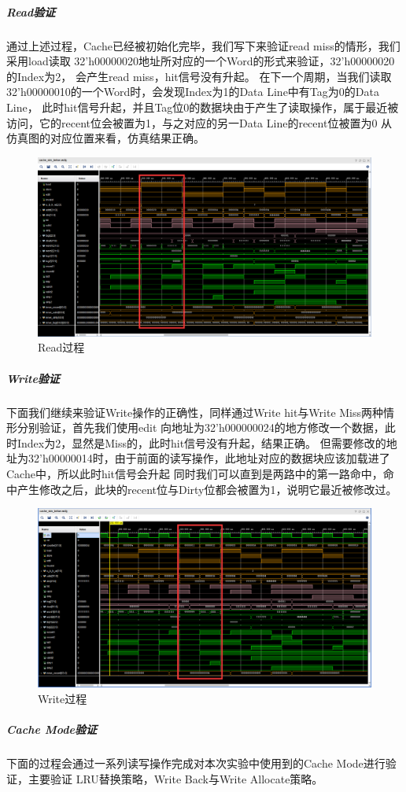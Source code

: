 \subparagraph{Read验证}
通过上述过程，Cache已经被初始化完毕，我们写下来验证read miss的情形，我们采用load读取
32'h00000020地址所对应的一个Word的形式来验证，32'h00000020的Index为2，
会产生read miss，hit信号没有升起。
在下一个周期，当我们读取32'h00000010的一个Word时，会发现Index为1的Data Line中有Tag为0的Data Line，
此时hit信号升起，并且Tag位0的数据块由于产生了读取操作，属于最近被访问，它的recent位会被置为1，与之对应的另一Data Line的recent位被置为0
从仿真图的对应位置来看，仿真结果正确。

\begin{figure}[H] %
	\centering %
	\includegraphics[width=1.0\textwidth]{figs/res3.png} %
	\caption{Read过程} %
	\label{Fig.4} %
\end{figure}

\subparagraph{Write验证}
下面我们继续来验证Write操作的正确性，同样通过Write hit与Write Miss两种情形分别验证，首先我们使用edit
向地址为32'h000000024的地方修改一个数据，此时Index为2，显然是Miss的，此时hit信号没有升起，结果正确。
但需要修改的地址为32'h00000014时，由于前面的读写操作，此地址对应的数据块应该加载进了Cache中，所以此时hit信号会升起
同时我们可以直到是两路中的第一路命中，命中产生修改之后，此块的recent位与Dirty位都会被置为1，说明它最近被修改过。

\begin{figure}[H] %
	\centering %
	\includegraphics[width=1.0\textwidth]{figs/res4.png} %
	\caption{Write过程} %
	\label{Fig.5} %
\end{figure}

\subparagraph{Cache Mode验证}
下面的过程会通过一系列读写操作完成对本次实验中使用到的Cache Mode进行验证，主要验证
LRU替换策略，Write Back与Write Allocate策略。